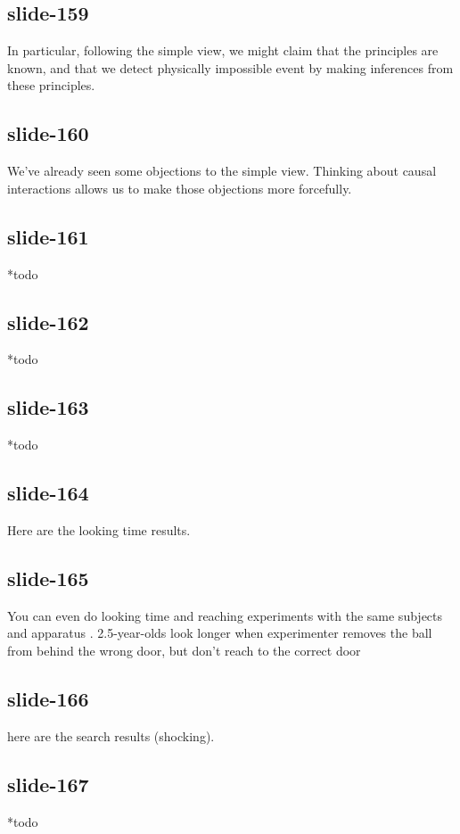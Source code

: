 \documentclass[12pt,\papersize]{extarticle}
\begin{document}
 
\subsection{slide-159}
In particular, following the simple view, we might claim that the principles are known, and that we detect physically impossible event by making inferences from these principles.
 
 
\subsection{slide-160}
We've already seen some objections to the simple view.
Thinking about causal interactions allows us to make those objections more forcefully.
 
 
\subsection{slide-161}
*todo
 
 
\subsection{slide-162}
*todo
 
 
\subsection{slide-163}
*todo
 
 
\subsection{slide-164}
Here are the looking time results.
 
 
\subsection{slide-165}
You can even do looking time and reaching experiments with the same subjects and apparatus \citep{Hood:2003yg}.
2.5-year-olds look longer when experimenter removes the ball from behind the wrong door, but don't reach to the correct door
 
 
\subsection{slide-166}
here are the search results (shocking).
 
 
\subsection{slide-167}
*todo
 
\end{document}
